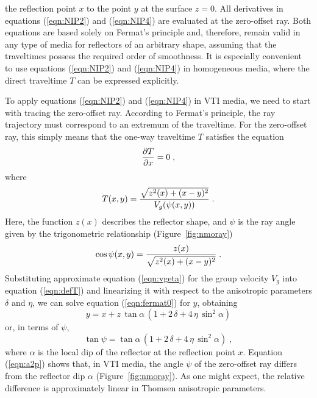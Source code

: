 the reflection point $x$ to the point $y$ at the surface $z=0$. All 
derivatives in equations (\ref{eqn:NIP2}) and (\ref{eqn:NIP4}) are evaluated 
at the zero-offset ray. Both equations are based
solely on Fermat's principle and, therefore, remain valid in any type of
media for reflectors of an arbitrary shape, assuming that the traveltimes
possess the required order of smoothness. It is especially convenient
to use equations (\ref{eqn:NIP2}) and (\ref{eqn:NIP4}) in 
homogeneous media, where the direct traveltime $T$ can be expressed explicitly.
\par
To apply equations (\ref{eqn:NIP2}) and (\ref{eqn:NIP4}) in VTI
media, we need to start with tracing the zero-offset ray. According to 
Fermat's principle, the ray trajectory must correspond to an extremum of
the traveltime. For the zero-offset ray, this simply means that the
one-way traveltime $T$ satisfies the equation
\begin{equation}
{{\partial T} \over {\partial x}} = 0\;,
\label{eqn:fermat0}
\end{equation}
where
\begin{equation}
T(x,y) = {\sqrt{z^2(x) + (x-y)^2} \over {V_g(\psi(x,y))}}\;.
\label{eqn:defT}
\end{equation}
Here, the function $z(x)$ describes the reflector shape, and $\psi$ is the ray angle given by the trigonometric relationship 
(Figure~\ref{fig:nmoray})
\begin{equation}
\cos{\psi(x,y)} = {z(x) \over \sqrt{z^2(x) + (x-y)^2}}\;.
\label{eqn:defpsi}
\end{equation}
Substituting approximate equation (\ref{eqn:vgeta}) for the group velocity
$V_g$ into equation (\ref{eqn:defT}) and linearizing it with respect to the
anisotropic parameters $\delta$ and $\eta$, we can solve equation
(\ref{eqn:fermat0}) for $y$, obtaining
\begin{equation}
y = x + z\,\tan{\alpha}\,(1 + 2\,\delta + 4\,\eta\,\sin^2{\alpha})
\label{eqn:defy}
\end{equation}
or, in terms of $\psi$,
\begin{equation}
\tan{\psi} = \tan{\alpha}\,(1 + 2\,\delta + 4\,\eta\,\sin^2{\alpha})\;,
\label{eqn:a2p}
\end{equation}
where $\alpha$ is the local dip of the reflector at the reflection
point $x$. Equation (\ref{eqn:a2p}) shows that, in VTI media, the
angle $\psi$ of the zero-offset ray differs from the reflector dip
$\alpha$ (Figure~\ref{fig:nmoray}). As one might expect, the relative
difference is approximately linear in Thomsen anisotropic parameters.

